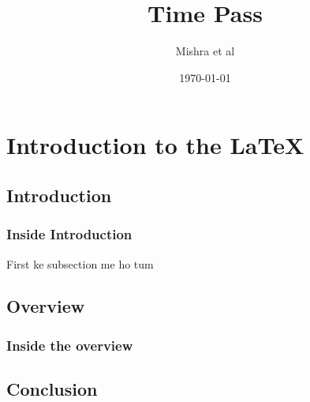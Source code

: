 \documentclass[12pt]{report}
\title{Time Pass}
\author{Mishra et al}
\date{\today}
\begin{document}
\maketitle
\chapter{Introduction to the \LaTeX}
\section{Introduction}
\subsection{Inside Introduction}
First ke subsection me ho tum 
\section{Overview}
\subsection{Inside the overview}
\section{Conclusion}
\end{document}
